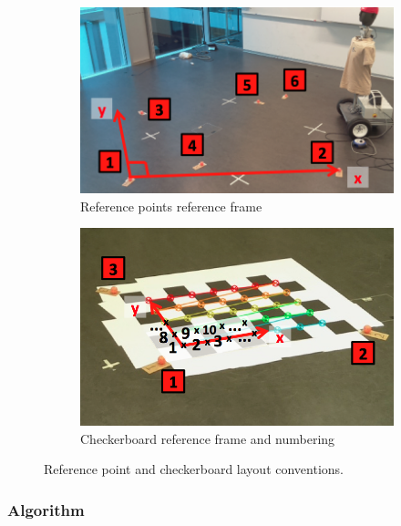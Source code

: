 \begin{figure}[htb]
	\centering
	\begin{subfigure}[b]{0.49\linewidth}
        \centering
		\includegraphics[height=0.6\linewidth]{files/ref_points.png}
		\caption{Reference points reference frame}
        \label{fig:ref_points}
	\end{subfigure}
	\begin{subfigure}[b]{0.49\linewidth}
        \centering
		\includegraphics[height=0.6\linewidth]{files/ref_checkerboard.png}
		\caption{Checkerboard reference frame and numbering}
		\label{fig:ref_checkerboard.png}
	\end{subfigure}
	\caption{Reference point and checkerboard layout conventions.} 
\end{figure}

\subsubsection{Algorithm}

